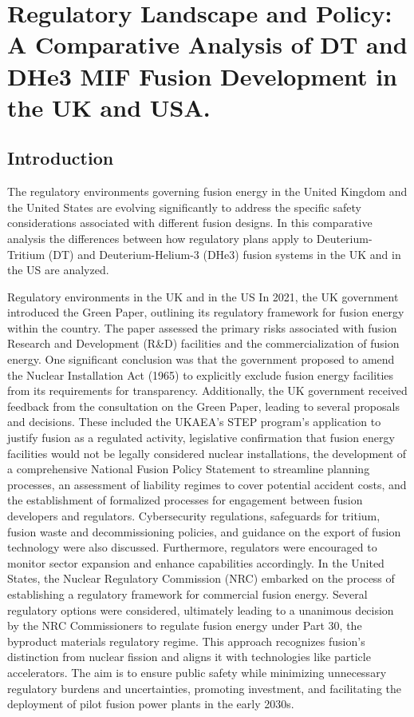 \section{Regulatory Landscape and Policy:  A Comparative Analysis of DT and DHe3 MIF Fusion Development in the UK and USA.}


\subsection{Introduction}
The regulatory environments governing fusion energy in the United Kingdom and the United States are evolving significantly to address the specific safety considerations associated with different fusion designs. In this comparative analysis the differences between how regulatory plans apply to Deuterium-Tritium (DT) and Deuterium-Helium-3 (DHe3) fusion systems in the UK and in the US are analyzed.

Regulatory environments in the UK and in the US
In 2021, the UK government introduced the Green Paper, outlining its regulatory framework for fusion energy within the country. The paper assessed the primary risks associated with fusion Research and Development (R&D) facilities and the commercialization of fusion energy. One significant conclusion was that the government proposed to amend the Nuclear Installation Act (1965) to explicitly exclude fusion energy facilities from its requirements for transparency. \cite{Business_2022}
Additionally, the UK government received feedback from the consultation on the Green Paper, leading to several proposals and decisions. These included the UKAEA's STEP program's application to justify fusion as a regulated activity, legislative confirmation that fusion energy facilities would not be legally considered nuclear installations, the development of a comprehensive National Fusion Policy Statement to streamline planning processes, an assessment of liability regimes to cover potential accident costs, and the establishment of formalized processes for engagement between fusion developers and regulators. Cybersecurity regulations, safeguards for tritium, fusion waste and decommissioning policies, and guidance on the export of fusion technology were also discussed. Furthermore, regulators were encouraged to monitor sector expansion and enhance capabilities accordingly. \cite{Business_2022}
In the United States, the Nuclear Regulatory Commission (NRC) embarked on the process of establishing a regulatory framework for commercial fusion energy. Several regulatory options were considered, ultimately leading to a unanimous decision by the NRC Commissioners to regulate fusion energy under Part 30, the byproduct materials regulatory regime. \cite{fusionindustryassociationDecisionSeparates} This approach recognizes fusion's distinction from nuclear fission and aligns it with technologies like particle accelerators. \cite{fusionindustryassociationDecisionSeparates} The aim is to ensure public safety while minimizing unnecessary regulatory burdens and uncertainties, promoting investment, and facilitating the deployment of pilot fusion power plants in the early 2030s.

